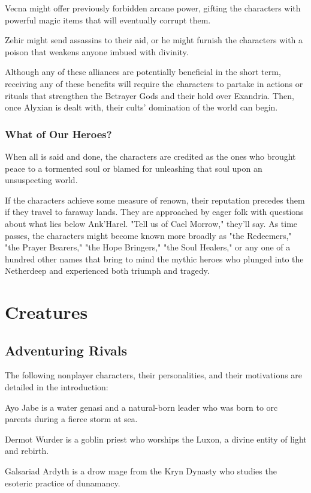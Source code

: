 \documentclass[10pt,a4paper,twoside,twocolumn,openany,nodeprecatedcode]{dndbook}
\begin{document}
Vecna might offer previously forbidden arcane power, gifting the characters with powerful magic items that will eventually corrupt them.

Zehir might send assassins to their aid, or he might furnish the characters with a poison that weakens anyone imbued with divinity.

Although any of these alliances are potentially beneficial in the short term, receiving any of these benefits will require the characters to partake in actions or rituals that strengthen the Betrayer Gods and their hold over Exandria. Then, once Alyxian is dealt with, their cults' domination of the world can begin.

\subsection{What of Our Heroes?}
When all is said and done, the characters are credited as the ones who brought peace to a tormented soul or blamed for unleashing that soul upon an unsuspecting world.

If the characters achieve some measure of renown, their reputation precedes them if they travel to faraway lands. They are approached by eager folk with questions about what lies below Ank'Harel. "Tell us of Cael Morrow," they'll say. As time passes, the characters might become known more broadly as "the Redeemers," "the Prayer Bearers," "the Hope Bringers," "the Soul Healers," or any one of a hundred other names that bring to mind the mythic heroes who plunged into the Netherdeep and experienced both triumph and tragedy.

\appendix

\chapter{Creatures}

\section{Adventuring Rivals}
The following nonplayer characters, their personalities, and their motivations are detailed in the introduction:

Ayo Jabe is a water genasi and a natural-born leader who was born to orc parents during a fierce storm at sea.

Dermot Wurder is a goblin priest who worships the Luxon, a divine entity of light and rebirth.

Galsariad Ardyth is a drow mage from the Kryn Dynasty who studies the esoteric practice of dunamancy.
\end{document}
